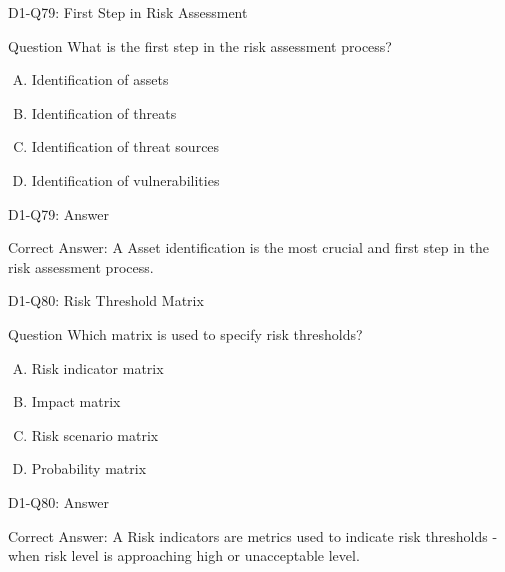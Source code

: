 \documentclass{beamer}
\begin{document}
	\begin{frame}{D1-Q79: First Step in Risk Assessment}
		\begin{block}{Question}
			What is the first step in the risk assessment process?
		\end{block}
		\begin{enumerate}[(A)]
			\item Identification of assets
			\item Identification of threats
			\item Identification of threat sources
			\item Identification of vulnerabilities
		\end{enumerate}
	\end{frame}
	\begin{frame}{D1-Q79: Answer}
		\begin{block}{Correct Answer: A}
			Asset identification is the most crucial and first step in the risk assessment process.
		\end{block}
	\end{frame}
	
	\begin{frame}{D1-Q80: Risk Threshold Matrix}
		\begin{block}{Question}
			Which matrix is used to specify risk thresholds?
		\end{block}
		\begin{enumerate}[(A)]
			\item Risk indicator matrix
			\item Impact matrix
			\item Risk scenario matrix
			\item Probability matrix
		\end{enumerate}
	\end{frame}
	\begin{frame}{D1-Q80: Answer}
		\begin{block}{Correct Answer: A}
			Risk indicators are metrics used to indicate risk thresholds - when risk level is approaching high or unacceptable level.
		\end{block}
	\end{frame}
	
\end{document}
